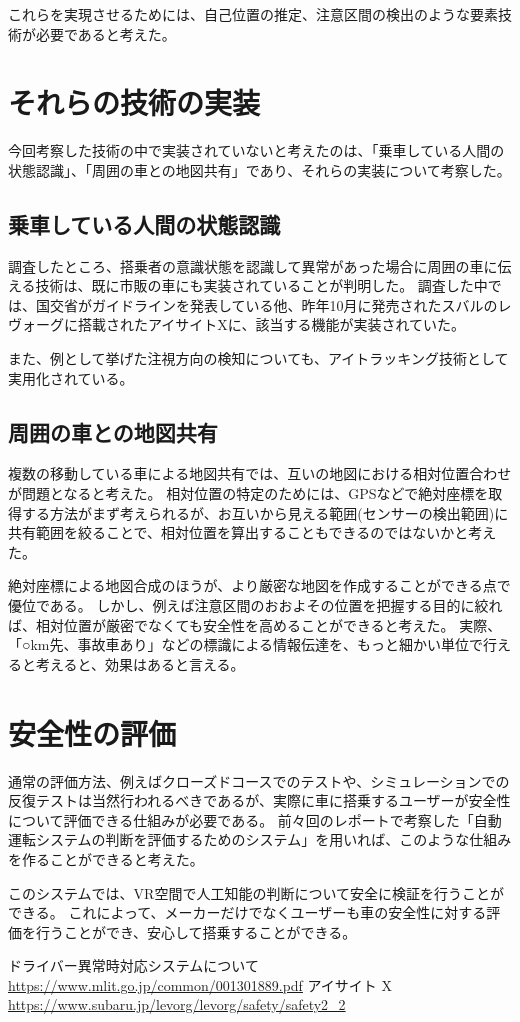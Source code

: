 \documentclass[a4paper,10pt]{jsarticle}
\begin{document}
これらを実現させるためには、自己位置の推定、注意区間の検出のような要素技術が必要であると考えた。

\section{それらの技術の実装}
今回考察した技術の中で実装されていないと考えたのは、「乗車している人間の状態認識」、「周囲の車との地図共有」であり、それらの実装について考察した。

\subsection{乗車している人間の状態認識}
調査したところ、搭乗者の意識状態を認識して異常があった場合に周囲の車に伝える技術は、既に市販の車にも実装されていることが判明した。
調査した中では、国交省がガイドラインを発表している\cite{kokko}他、昨年10月に発売されたスバルのレヴォーグに搭載されたアイサイトXに、該当する機能が実装されていた\cite{aisaito}。

また、例として挙げた注視方向の検知についても、アイトラッキング技術として実用化されている。

\subsection{周囲の車との地図共有}
複数の移動している車による地図共有では、互いの地図における相対位置合わせが問題となると考えた。
相対位置の特定のためには、GPSなどで絶対座標を取得する方法がまず考えられるが、お互いから見える範囲(センサーの検出範囲)に共有範囲を絞ることで、相対位置を算出することもできるのではないかと考えた。

絶対座標による地図合成のほうが、より厳密な地図を作成することができる点で優位である。
しかし、例えば注意区間のおおよその位置を把握する目的に絞れば、相対位置が厳密でなくても安全性を高めることができると考えた。
実際、「○km先、事故車あり」などの標識による情報伝達を、もっと細かい単位で行えると考えると、効果はあると言える。

\section{安全性の評価}
通常の評価方法、例えばクローズドコースでのテストや、シミュレーションでの反復テストは当然行われるべきであるが、実際に車に搭乗するユーザーが安全性について評価できる仕組みが必要である。
前々回のレポートで考察した「自動運転システムの判断を評価するためのシステム」を用いれば、このような仕組みを作ることができると考えた。

このシステムでは、VR空間で人工知能の判断について安全に検証を行うことができる。
これによって、メーカーだけでなくユーザーも車の安全性に対する評価を行うことができ、安心して搭乗することができる。

\begin{thebibliography}{9}
  ドライバー異常時対応システムについて\url{https://www.mlit.go.jp/common/001301889.pdf}
  アイサイト X \url{https://www.subaru.jp/levorg/levorg/safety/safety2_2}
\end{thebibliography}
\end{document}
